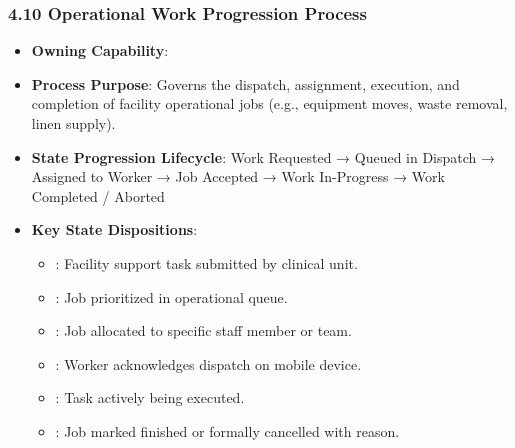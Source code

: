 \par\smallskip
{}\label{rad:processes:218}
\subsubsection*{4.10 Operational Work Progression Process}
\label{rad:processes:219}

\begin{itemize}

\item
\textbf{Owning Capability}: \texttt{}



\item
\textbf{Process Purpose}: Governs the dispatch, assignment, execution, and completion of facility operational jobs (e.g., equipment moves, waste removal, linen supply).



\item
\textbf{State Progression Lifecycle}: Work Requested → Queued in Dispatch → Assigned to Worker → Job Accepted → Work In-Progress → Work Completed /\allowbreak{} Aborted



\item
\textbf{Key State Dispositions}:


\begin{itemize}

\item
\texttt{}: Facility support task submitted by clinical unit.



\item
\texttt{}: Job prioritized in operational queue.



\item
\texttt{}: Job allocated to specific staff member or team.



\item
\texttt{}: Worker acknowledges dispatch on mobile device.



\item
\texttt{}: Task actively being executed.



\item
\texttt{}: Job marked finished or formally cancelled with reason.



\end{itemize}


\end{itemize}
\label{rad:processes:231}


